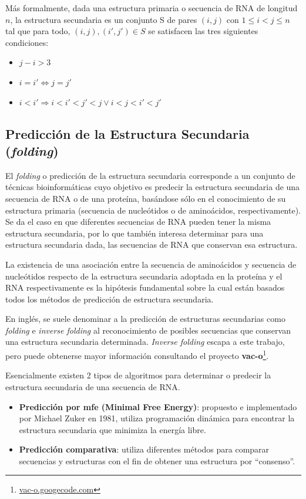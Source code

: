\par Más formalmente, dada una estructura primaria o secuencia de RNA de longitud $n$, la estructura secundaria es un conjunto S de pares $(i,j)$ con $1\leq i < j \leq n$ tal que para todo, $(i,j), (i',j') \in S$ se satisfacen las tres siguientes     condiciones:
\begin{itemize}
	\item $j-i > 3$
    \item $i=i' \Leftrightarrow j=j'$
    \item $i< i'\Rightarrow i < i' < j' < j \lor i < j < i' < j'$ 
\end{itemize}

\subsection{Predicción de la Estructura Secundaria (\textbf{\emph{folding}})}

\par El \emph{folding} o predicción de la estructura secundaria corresponde a un conjunto de técnicas bioinformáticas cuyo objetivo es predecir la estructura secundaria de una secuencia de RNA o de una proteína, basándose sólo en el conocimiento de su estructura primaria (secuencia de nucleótidos o de aminoácidos, respectivamente). Se da el caso en que diferentes secuencias de RNA pueden tener la misma estructura secundaria, por lo que también interesa determinar para una estructura secundaria dada, las secuencias de RNA que conservan esa estructura.

\par La existencia de una asociación entre la secuencia de aminoácidos y secuencia de nucleótidos respecto de la estructura secundaria adoptada en la proteína y el RNA respectivamente es la hipótesis fundamental sobre la cual están basados todos los métodos de predicción de estructura secundaria. 
 
\par En inglés, se suele denominar a la predicción de estructuras secundarias como \emph{folding} e \emph{inverse folding} al reconocimiento de posibles secuencias que conservan una estructura secundaria determinada. \emph{Inverse folding} escapa a este trabajo, pero puede obtenerse mayor información consultando el proyecto \textbf{vac-o}\footnote{\url{vac-o.googecode.com}}.

\par Esencialmente existen 2 tipos de algoritmos para determinar o predecir la estructura secundaria de una secuencia de RNA.
\begin{itemize} 
	\item \textbf{Predicción por mfe (Minimal Free Energy)}: propuesto e implementado por Michael Zuker en 1981\cite{Zuker81}, utiliza programación dinámica para encontrar la estructura secundaria que minimiza la energía libre.

	\item \textbf{Predicción comparativa}: utiliza diferentes métodos para comparar secuencias y estructuras con el fin de obtener una estructura por ``consenso''\cite{Gardner04}.
\end{itemize}

